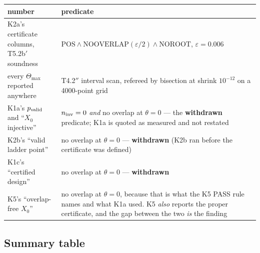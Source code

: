 \documentclass[10pt,a4paper]{article}
\begin{document}
\begin{table}[h]\centering\small
\begin{tabular}{@{}lp{95mm}@{}}
\toprule
number & predicate \\
\midrule
K2a's certificate columns, T5.2b$'$ soundness & $\mathrm{POS}\wedge\mathrm{NOOVERLAP}(\varepsilon/2)\wedge\mathrm{NOROOT}$, $\varepsilon = 0.006$ \\
every $\Theta_{\max}$ reported anywhere & T4.2$''$ interval scan, refereed by bisection at shrink $10^{-12}$ on a 4000-point grid \\
K1a's $p_{\rm valid}$ and ``$X_0$ injective'' & $n_{\rm inv} = 0$ \emph{and} no overlap at $\theta=0$ --- the \textbf{withdrawn} predicate; K1a is quoted as measured and not restated \\
K2b's ``valid ladder point'' & no overlap at $\theta=0$ --- \textbf{withdrawn} (K2b ran before the certificate was defined) \\
K1c's ``certified design'' & no overlap at $\theta=0$ --- \textbf{withdrawn} \\
K5's ``overlap-free $X_0$'' & no overlap at $\theta=0$, because that is what the K5 PASS rule names and what K1a used. K5 \emph{also} reports the proper certificate, and the gap between the two \emph{is} the finding \\
\bottomrule
\end{tabular}
\end{table}

\subsection{Summary table}
\end{document}
